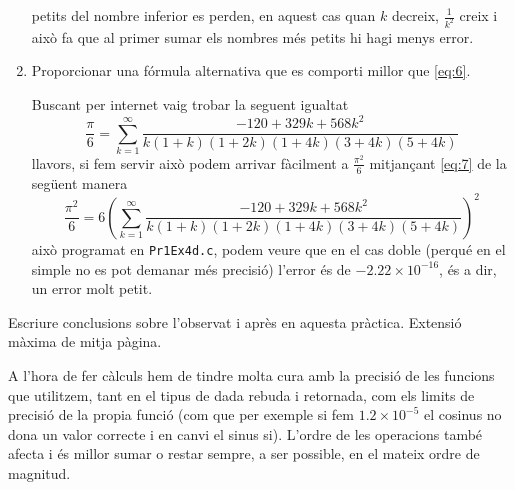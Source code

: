 \documentclass[a4paper, 12pt]{article}
\begin{document}
\begin{exercici}
\begin{enumerate}[label=\alph*)]
\begin{solucio}
                petits del nombre inferior es perden, en aquest cas quan $k$ decreix, $\frac{1}{k^2}$
                creix i això fa que al primer sumar els nombres més petits hi hagi menys error.  
            \end{solucio}
            \item Proporcionar una fórmula alternativa que es comporti millor que \eqref{eq:6}.\\
            \begin{solucio}
                Buscant per internet vaig trobar la seguent igualtat
                \begin{equation}
                    \frac{\pi}{6} = \sum\limits_{k=1}^{\infty} \frac{-120+329k+568k^2}{k(1+k)(1+2k)(1+4k)(3+4k)(5+4k)}
                    \label{eq:7}
                \end{equation}
                llavors, si fem servir això podem arrivar fàcilment a $\frac{\pi^2}{6}$ mitjançant
                \eqref{eq:7} de la següent manera
                \begin{equation}
                    \frac{\pi^2}{6} = 6\left(\sum\limits_{k=1}^{\infty} \frac{-120+329k+568k^2}{k(1+k)(1+2k)(1+4k)(3+4k)(5+4k)}\right)^2
                    \label{eq:8}
                \end{equation}
                això programat en \verb|Pr1Ex4d.c|, podem veure que en el cas doble (perqué en el
                simple no es pot demanar més precisió) l'error és de $-2.22\times10^{-16}$, és a dir,
                un error molt petit. 
            \end{solucio}
        \end{enumerate}
    \end{exercici}
    \newpage

    \begin{exercici}
        Escriure conclusions sobre l'observat i après en aquesta pràctica. Extensió màxima de mitja
        pàgina. 
    \end{exercici}
    \begin{solucio}
        A l'hora de fer càlculs hem de tindre molta cura amb la precisió de les funcions que
        utilitzem, tant en el tipus de dada rebuda i retornada, com els limits de precisió de la
        propia funció (com que per exemple si fem $1.2 \times 10^{-5}$ el cosinus no dona un valor
        correcte i en canvi el sinus si). L'ordre de les operacions també afecta i és millor sumar o
        restar sempre, a ser possible, en el mateix ordre de magnitud. 
    \end{solucio}
\end{document}
